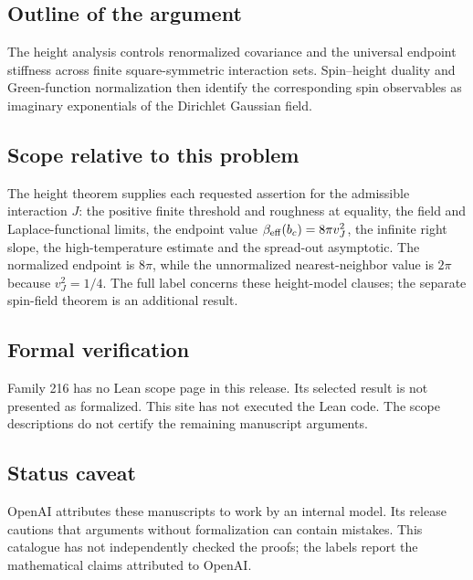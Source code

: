\documentclass[11pt]{article}
\begin{document}
\subsection{Outline of the argument}
The height analysis controls renormalized covariance and the universal endpoint stiffness across finite square-symmetric interaction sets. Spin--height duality and Green-function normalization then identify the corresponding spin observables as imaginary exponentials of the Dirichlet Gaussian field.

\subsection{Scope relative to this problem}
The height theorem supplies each requested assertion for the admissible interaction $J$: the positive finite threshold and roughness at equality, the field and Laplace-functional limits, the endpoint value $\beta_{\rm eff}(b_c)=8\pi v_J^2$, the infinite right slope, the high-temperature estimate and the spread-out asymptotic. The normalized endpoint is $8\pi$, while the unnormalized nearest-neighbor value is $2\pi$ because $v_J^2=1/4$. The full label concerns these height-model clauses; the separate spin-field theorem is an additional result.

\subsection{Formal verification}
Family 216 has no Lean scope page in this release. Its selected result is not presented as formalized. This site has not executed the Lean code. The scope descriptions do not certify the remaining manuscript arguments.

\subsection{Status caveat}
OpenAI attributes these manuscripts to work by an internal model. Its release cautions that arguments without formalization can contain mistakes. This catalogue has not independently checked the proofs; the labels report the mathematical claims attributed to OpenAI.
\end{document}
